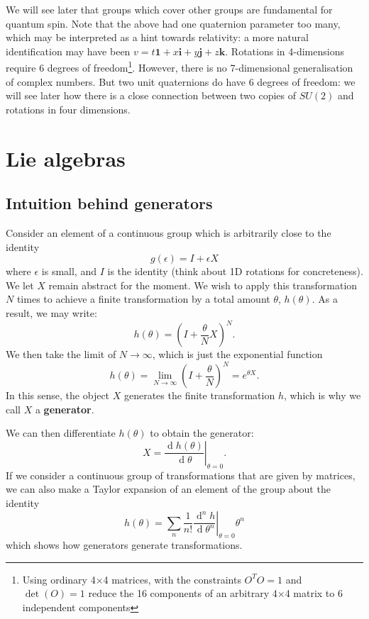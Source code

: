 \documentclass[11pt]{article}
\numberwithin{equation}{section}
\newcommand{\deriv}[2]{\frac{\ensuremath{\operatorname{d}\!{#1}}}{\ensuremath{\operatorname{d}\!{#2}}}}
\newcommand{\derivn}[3]{\frac{\ensuremath{\operatorname{d}^{#1}\!{#2}}}{\ensuremath{\operatorname{d}\!{#3}^{#1}}}}
\begin{document}
We will see later that groups which cover other groups are fundamental for quantum spin. Note that the above had one quaternion parameter too many, which may be interpreted as a hint towards relativity: a more natural identification may have been $v=t\mathbf{1}+x\mathbf{i}+y\mathbf{j}+z\mathbf{k}$. Rotations in 4-dimensions require 6 degrees of freedom\footnote{Using ordinary 4$\times$4 matrices, with the constraints $O^TO=1$ and $\det(O)=1$ reduce the 16 components of an arbitrary 4$\times$4 matrix to 6 independent components}. However, there is no 7-dimensional generalisation of complex numbers. But two unit quaternions do have 6 degrees of freedom: we will see later how there is a close connection between two copies of $SU(2)$ and rotations in four dimensions.

\section{Lie algebras}
\subsection{Intuition behind generators}
Consider an element of a continuous group which is arbitrarily close to the identity
\begin{equation}
g(\epsilon) = I + \epsilon X
\end{equation}
where $\epsilon$ is small, and $I$ is the identity (think about 1D rotations for concreteness). We let $X$ remain abstract for the moment. We wish to apply this transformation $N$ times to achieve a finite transformation by a total amount $\theta$, $h(\theta)$. As a result, we may write:
\begin{equation}
h(\theta) = (I + \frac{\theta}{N} X)^N.
\end{equation}
We then take the limit of $N \rightarrow \infty$, which is just the exponential function
\begin{equation}
h(\theta) = \lim_{N \rightarrow \infty} (I + \frac{\theta}{N})^N = e^{\theta X}.
\end{equation}
In this sense, the object $X$ generates the finite transformation $h$, which is why we call $X$ a \textbf{generator}.

We can then differentiate $h(\theta)$ to obtain the generator:
\begin{equation}
X=\left.\deriv{h(\theta)}{\theta}\right|_{\theta=0}. \label{eq:explicit-generator-from-finite-transform}
\end{equation}
If we consider a continuous group of transformations that are given by matrices, we can also make a Taylor expansion of an element of the group about the identity 
\begin{equation}
h(\theta) = \sum_n\frac{1}{n!}\left.\derivn{n}{h}{\theta}\right|_{\theta=0}\theta^n
\end{equation}
which shows how generators generate transformations.
\end{document}
